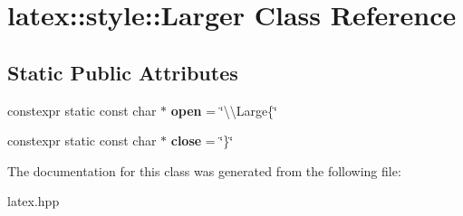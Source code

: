 \hypertarget{classlatex_1_1style_1_1Larger}{\section{latex\-:\-:style\-:\-:Larger Class Reference}
\label{classlatex_1_1style_1_1Larger}
}
\subsection*{Static Public Attributes}
\begin{DoxyCompactItemize}
\item 
\hypertarget{classlatex_1_1style_1_1Larger_aa4c8be118e5c74db90d8040a2a8c9c89}{constexpr static const char $\ast$ {\bfseries open} = \char`\"{}\textbackslash{}\textbackslash{}Large\{\char`\"{}}\label{classlatex_1_1style_1_1Larger_aa4c8be118e5c74db90d8040a2a8c9c89}

\item 
\hypertarget{classlatex_1_1style_1_1Larger_aa49797027b270c812f5c7ac409567e72}{constexpr static const char $\ast$ {\bfseries close} = \char`\"{}\}\char`\"{}}\label{classlatex_1_1style_1_1Larger_aa49797027b270c812f5c7ac409567e72}

\end{DoxyCompactItemize}


The documentation for this class was generated from the following file\-:\begin{DoxyCompactItemize}
\item 
latex.\-hpp\end{DoxyCompactItemize}
